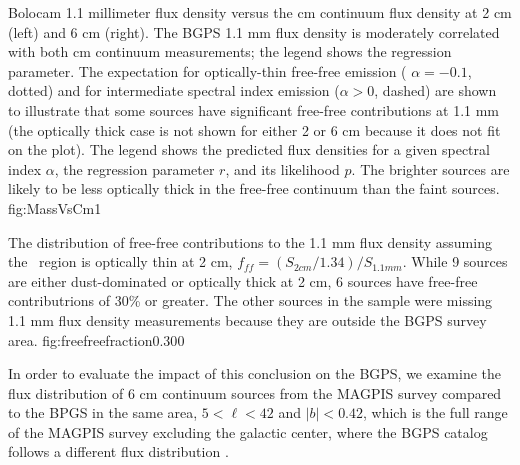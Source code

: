{Bolocam 1.1 millimeter flux density versus the cm continuum flux density at 2
cm (left) and 6 cm (right).  The BGPS 1.1 mm flux density is moderately
correlated with both cm continuum measurements; the legend shows the regression
parameter.  The expectation for optically-thin free-free
emission ( $\alpha = -0.1$, dotted) and for intermediate spectral index emission
($\alpha > 0$, dashed) are shown to illustrate that some sources have
significant free-free contributions at 1.1 mm (the optically thick case is not
shown for either 2 or 6 cm because it does not fit on the plot).
The legend shows the predicted flux densities for a given spectral index
$\alpha$, the regression parameter $r$, and its likelihood $p$.  The brighter
sources are likely to be less optically thick in the free-free continuum than
the faint sources. }
{fig:MassVsCm}{1}

{The distribution of free-free contributions to the 1.1 mm flux density
assuming the \uchii\ region is optically thin at 2 cm, $f_{ff} = (S_{2
cm}/1.34)/S_{1.1 mm}$.  While 9 sources are either dust-dominated or optically
thick at 2 cm, 6 sources have free-free contributrions of 30\% or greater.  The
other sources in the sample were missing 1.1 mm flux density measurements
because they are outside the BGPS survey area.
}
{fig:freefreefraction}{0.30}{0}

In order to evaluate the impact of this conclusion on the BGPS, we examine the
flux distribution of 6 cm continuum sources from the MAGPIS survey compared to
the BPGS in the same area, $5<\ell<42$ and $|b|<0.42$, which is the full range
of the MAGPIS survey excluding the galactic center, where the BGPS catalog
follows a different flux distribution \citep{Bally2010}.  

